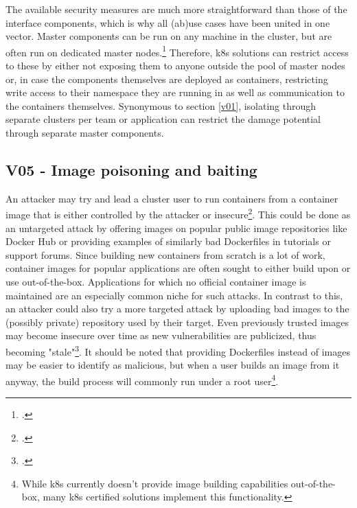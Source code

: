 The available security measures are much more straightforward than those of the interface components, which is why all (ab)use cases have been united in one vector.
Master components can be run on any machine in the cluster, but are often run on dedicated master nodes.\footcite[][, section 'Master Components']{k8sComponents}
Therefore, \gls{k8s} solutions can restrict access to these by either not exposing them to anyone outside the pool of master nodes or, in case the components themselves are deployed as containers, restricting write access to their namespace they are running in as well as communication to the containers themselves.
Synonymous to section \ref{v01}, isolating through separate clusters per team or application can restrict the damage potential through separate master components.

\subsection{V05 - Image poisoning and baiting} \label{v05}
An attacker may try and lead a cluster user to run containers from a container image that is either controlled by the attacker or insecure\footcite[][, p. 13 to 14]{nistK8s}.
This could be done as an untargeted attack by offering images on popular public image repositories like Docker Hub or providing examples of similarly bad Dockerfiles in tutorials or support forums.
Since building new containers from scratch is a lot of work, container images for popular applications are often sought to either build upon or use out-of-the-box.
Applications for which no official container image is maintained are an especially common niche for such attacks.
In contrast to this, an attacker could also try a more targeted attack by uploading bad images to the (possibly private) repository used by their target.
Even previously trusted images may become insecure over time as new vulnerabilities are publicized, thus becoming "stale"\footcite[][, p. 14]{nistK8s}.
It should be noted that providing Dockerfiles instead of images may be easier to identify as malicious, but when a user builds an image from it anyway, the build process will commonly run under a root user\footnote{While \gls{k8s} currently doesn't provide image building capabilities out-of-the-box, many \gls{k8s} certified solutions implement this functionality.}.

